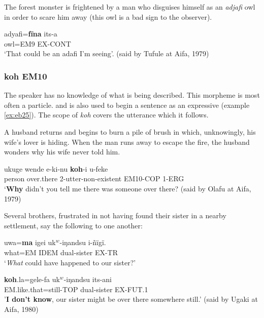 \documentclass[output=paper]{langsci/langscibook}
\begin{document}
The forest monster is frightened by a man who disguises himself as an \textit{adjafi} owl in order to scare him away (this owl is a bad sign to the observer).

\begin{exe}
	\ex \label{ex:eb23}
	\gll adyafi=\textbf{fïna} its-a\\
	owl=EM9 EX-CONT\\
	\trans ‘That could be an adafi I’m seeing’. (said by Tufule at Aifa, 1979)
\end{exe}

\subsubsection{koh EM10}  
The speaker has no knowledge of what is being described. This morpheme is most often a particle. and is also used to begin a sentence as an expressive (example \ref{ex:eb25}). The scope of \textit{koh} covers the utterance which it follows.
  
A husband returns and begins to burn a pile of brush in which, unknowingly,  his wife’s lover is hiding. When the man runs away to escape the fire, the husband wonders why his wife never told him. 


\begin{exe}
	\ex \label{ex:eb24}
	\gll ukuge wende e-ki-nu \textbf{koh}-i u-feke\\
	person over.there 2-utter-non-existent EM10-COP 1-ERG\\
	\trans ‘\textbf{Why} didn’t you tell me there was someone over there? (said by Olafu at Aifa, 1979)
\end{exe}

Several brothers, frustrated in not having found their sister in a nearby settlement, say the following to one another:


\begin{exe}
	\ex \label{ex:eb25}
	\gll uwa=\textbf{ma} igei uk$^w$-iŋandsu i-ñïgï.\\ %
	what=EM IDEM dual-sister EX-TR\\
	\trans ‘\textit{What} could have happened to our sister?’
\end{exe}

\begin{exe}
	\ex \label{ex:eb26}
	\gll \textbf{koh}.la=gele-fa uk$^w$-iŋandsu its-ani\\
	EM.like.that=still-TOP dual-sister EX-FUT.1\\
	\trans '\textbf{I don’t know}, our sister might  be over there somewhere still.’ (said by Ugaki at Aifa, 1980)
\end{exe}
\end{document}
